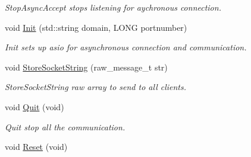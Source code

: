 \begin{DoxyCompactItemize}
\begin{DoxyCompactList}\small\item\em Stop\+Async\+Accept stops listening for aychronous connection. \end{DoxyCompactList}\item 
void \hyperlink{class_socket_back_end_a3a8201e3fa13bc5b728fe5578e902864}{Init} (std\+::string domain, L\+O\+N\+G portnumber)
\begin{DoxyCompactList}\small\item\em Init sets up asio for asynchronous connection and communication. \end{DoxyCompactList}\item 
void \hyperlink{class_socket_back_end_ae133caf8c2d35a7831df044fd31f353e}{Store\+Socket\+String} (raw\+\_\+message\+\_\+t str)
\begin{DoxyCompactList}\small\item\em Store\+Socket\+String raw array to send to all clients. \end{DoxyCompactList}\item 
\hypertarget{class_socket_back_end_ae2b65ea98340dd75a0b9ebcf67d9fb1e}{}void \hyperlink{class_socket_back_end_ae2b65ea98340dd75a0b9ebcf67d9fb1e}{Quit} (void)\label{class_socket_back_end_ae2b65ea98340dd75a0b9ebcf67d9fb1e}

\begin{DoxyCompactList}\small\item\em Quit stop all the communication. \end{DoxyCompactList}\item 
\hypertarget{class_socket_back_end_a556ce8aa96a5cfae2e3aec068e64d919}{}void \hyperlink{class_socket_back_end_a556ce8aa96a5cfae2e3aec068e64d919}{Reset} (void)\label{class_socket_back_end_a556ce8aa96a5cfae2e3aec068e64d919}


\end{DoxyCompactItemize}
